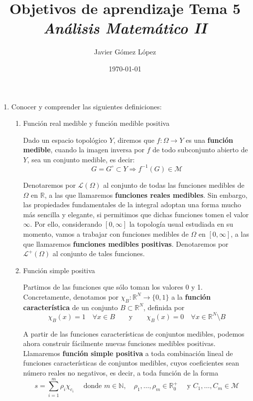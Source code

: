 \documentclass[a4paper, 12pt]{article}
\title{\textbf{Objetivos de aprendizaje Tema 5} \\ \textit{Análisis Matemático II}}
\author{Javier Gómez López}
\date{\today}
\begin{document}
\maketitle

\begin{enumerate}[label=\textbf{\arabic*}.]

\item Conocer y comprender las siguientes definiciones:

\begin{enumerate}[label=\textit{\alph*)}]
	\item Función real medible y función medible positiva
	
	Dado un espacio topológico \(Y\), diremos que \(f: \Omega \to Y\) es una \textbf{función medible}, cuando la imagen inversa por \(f\) de todo subconjunto abierto de \(Y\), sea un conjunto medible, es decir:
	\[
		G = G^{\circ} \subset Y \Rightarrow f^{-1} (G) \in \mathcal{M}
	\]
	
	Denotaremos por \(\mathcal{L}(\Omega)\) al conjunto de todas las funciones medibles de \(\Omega\) en \(\mathbb{R}\), a las que llamaremos \textbf{funciones reales medibles}. Sin embargo, las propiedades fundamentales de la integral adoptan una forma mucho más sencilla y elegante, si permitimos que dichas funciones tomen el valor \(\infty\). Por ello, considerando \([0, \infty]\) la topología usual estudiada en su momento, vamos a trabajar con funciones medibles de \(\Omega\) en \([0, \infty]\), a las que llamaremos \textbf{funciones medibles positivas}. Denotaremos por \(\mathcal{L}^{+} ( \Omega)\) al conjunto de tales funciones.
	
	\item Función simple positiva
	
	Partimos de las funciones que sólo toman los valores 0 y 1. Concretamente, denotamos por \(\chi_B: \mathbb{R}^N \to \{0,1\}\) a la \textbf{función característica} de un conjunto \(B \subset \mathbb{R}^N\), definida por
	\[
		\chi_B (x) = 1 \quad \forall x \in B \qquad \text{y} \qquad \chi_B (x) = 0 \quad \forall x \in \mathbb{R}^N \setminus B
	\]
	
	A partir de las funciones características de conjuntos medibles, podemos ahora construir fácilmente nuevas funciones medibles positivas. \\
	
	Llamaremos \textbf{función simple positiva} a toda combinación lineal de funciones características de conjuntos medibles, cuyos coeficientes sean número reales no negativos, es decir, a toda función de la forma
	\[
		s = \sum_{i = 1}^{m} \rho_i \chi_{c_i} \quad \text{ donde } m \in \mathbb{N}, \quad \rho_1, \dotsc, \rho_m \in \mathbb{R}_0^+ \quad \text{ y } C_1, \dotsc, C_m \in \mathcal{M}
	\]
\end{enumerate}


\end{enumerate}
\end{document}

